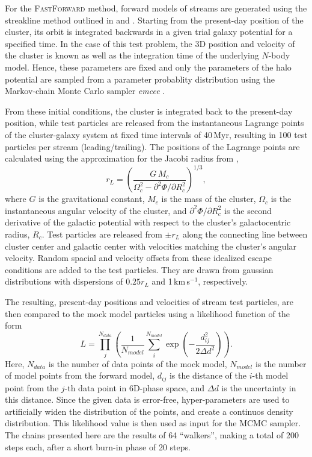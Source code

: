 For the \textsc{FastForward} method, forward models of streams are generated using the streakline method outlined in \citet{Kupper12} and \citet{Bonaca14}. 
Starting from the present-day position of the cluster, its orbit is integrated backwards in a given trial galaxy potential for a specified time. 
In the case of this test problem, the 3D position and velocity of the cluster is known as well as the integration time of the underlying $N$-body model. 
Hence, these parameters are fixed and only the parameters of the halo potential are sampled from a parameter probablity distribution using the Markov-chain Monte Carlo sampler \textit{emcee} \citep{Foreman13}.

From these initial conditions, the cluster is integrated back to the present-day position, while test particles are released from the instantaneous Lagrange points of the cluster-galaxy system at fixed time intervals of 40\,Myr, resulting in 100 test particles per stream (leading/trailing). 
The positions of the Lagrange points are calculated using the approximation for the Jacobi radius from \citet{King62},
\begin{equation}
r_{L} = \left( \frac{G\,M_c}{\Omega_c^2-\partial^2\Phi/\partial R_c^2}\right)^{1/3},
\end{equation}
where $G$ is the gravitational constant, $M_c$ is the mass of the cluster, $\Omega_c$ is the instantaneous angular velocity of the cluster, and $\partial^2\Phi/\partial R_c^2$ is the second derivative of the galactic potential with respect to the cluster's galactocentric radius, $R_c$.
Test particles are released from $\pm r_L$ along the connecting line between cluster center and galactic center with velocities matching the cluster's angular velocity. 
Random spacial and velocity offsets from these idealized escape conditions are added to the test particles. 
They are drawn from gaussian distributions with dispersions of $0.25r_L$ and 1\,km\,s$^{-1}$, respectively.
 
The resulting, present-day positions and velocities of stream test particles,  are then compared to the mock model particles using a likelihood function of the form
\begin{equation}
L = \prod_j^{N_{data}} \left(\frac{1}{N_{model}}\sum_i^{N_{model}} \exp{\left(-\frac{d_{ij}^2}{2\Delta d^2}\right)} \right).
\end{equation} 
Here, $N_{data}$ is the number of data points of the mock model, $N_{model}$ is the number of model points from the forward model, $d_{ij}$ is the distance of the $i$-th model point from the $j$-th data point in 6D-phase space, and $\Delta d$ is the uncertainty in this distance. 
Since the given data is error-free, hyper-parameters are used to artificially widen the distribution of the points, and create a continuos density distribution. 
This likelihood value is then used as input for the MCMC sampler. 
The chains presented here are the results of 64 ``walkers'', making a total of 200 steps each, after a short burn-in phase of 20 steps.
